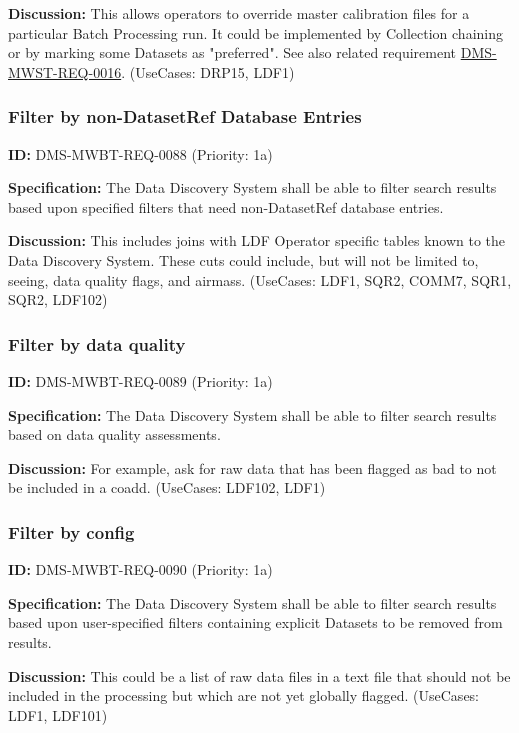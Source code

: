 \documentclass[SE,toc,lsstdraft]{lsstdoc}
\begin{document}
\textbf{Discussion:}
This allows operators to override master calibration files for a particular Batch Processing run. It could be implemented by Collection chaining or by marking some Datasets as "preferred". See also related requirement \hyperref[DMS-MWST-REQ-0016]{DMS-MWST-REQ-0016}. (UseCases: DRP15, LDF1)

\subsubsection{Filter by non-DatasetRef Database Entries}

\label{DMS-MWBT-REQ-0088}
\textbf{ID:} DMS-MWBT-REQ-0088 (Priority: 1a)

\textbf{Specification:}
The Data Discovery System shall be able to filter search results based upon specified filters that need non-DatasetRef database entries.

\textbf{Discussion:}
This includes joins with LDF Operator specific tables known to the Data Discovery System. These cuts could include, but will not be limited to, seeing, data quality flags, and airmass. (UseCases: LDF1, SQR2, COMM7, SQR1, SQR2, LDF102)

\subsubsection{Filter by data quality}

\label{DMS-MWBT-REQ-0089}
\textbf{ID:} DMS-MWBT-REQ-0089 (Priority: 1a)

\textbf{Specification:}
The Data Discovery System shall be able to filter search results based on data quality assessments.

\textbf{Discussion:}
For example, ask for raw data that has been flagged as bad to not be included in a coadd. (UseCases: LDF102, LDF1)

\subsubsection{Filter by config}

\label{DMS-MWBT-REQ-0090}
\textbf{ID:} DMS-MWBT-REQ-0090 (Priority: 1a)

\textbf{Specification:}
The Data Discovery System shall be able to filter search results based upon user-specified filters containing explicit Datasets to be removed from results.

\textbf{Discussion:}
This could be a list of raw data files in a text file that should not be included in the processing but which are not yet globally flagged. (UseCases: LDF1, LDF101)
\end{document}
